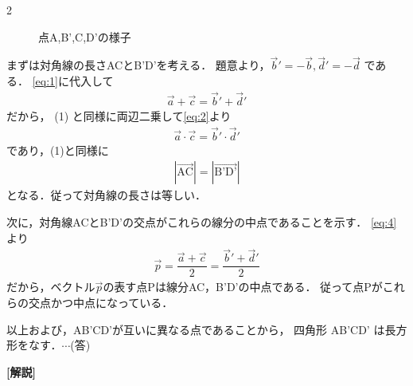 \documentclass[../../main.tex]{subfiles}
\begin{document}
\begin{multicols}{2}
\begin{figure}[H]
    \caption{点A,B',C,D'の様子}
    \label{1997-3:fig:2}
  \end{figure}

  まずは対角線の長さACとB'D'を考える．
  題意より，$\vec{b}' = -\vec{b}, \vec{d}' = -\vec{d}$ である．
  \cref{eq:1}に代入して
  \begin{align}
    \vec{a} + \vec{c} = \vec{b}'+\vec{d}' \label{eq:4}
  \end{align}
  だから，
  (1) と同様に両辺二乗して\cref{eq:2}より
  \begin{align}
    \vec{a} \cdot \vec{c} = \vec{b}' \cdot \vec{d}'
  \end{align}
  であり，(1)と同様に
  \begin{align}
    |\overrightarrow{\text{AC}}| = |\overrightarrow{\text{B'D'}}|
  \end{align}
  となる．従って対角線の長さは等しい．

  次に，対角線ACとB'D'の交点がこれらの線分の中点であることを示す．
  \cref{eq:4}より
  \begin{align}
    \vec{p} = \dfrac{\vec{a} + \vec{c}}{2} = \dfrac{\vec{b}'+\vec{d}'}{2}
  \end{align}
  だから，ベクトル$\vec{p}$の表す点Pは線分AC，B'D'の中点である．
  従って点Pがこれらの交点かつ中点になっている．

  以上および，AB'CD'が互いに異なる点であることから，
  四角形 AB'CD' は長方形をなす．$\cdots$(答)

  {\bf [解説]}





  \newpage
\end{multicols}
\end{document}
